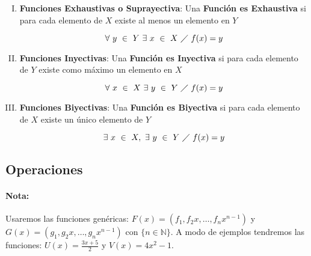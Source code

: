 \begin{enumerate}[I.]

\item \textbf{Funciones Exhaustivas o Suprayectiva}: Una \textbf{Función es 
Exhaustiva} si para cada elemento de $X$ existe al menos un elemento en $Y$

\begin{equation}
\forall\ y\ \in\ Y\ \exists\ x\ \in\ X\ \diagup\ f(x) = y
\end{equation}

\item \textbf{Funciones Inyectivas}: Una \textbf{Función es Inyectiva} si para 
cada elemento de $Y$ existe como máximo un elemento en $X$

\begin{equation}
\forall\ x\ \in\ X\ \exists\ y\ \in\ Y\ \diagup\ f(x) = y
\end{equation}

\item \textbf{Funciones Biyectivas}: Una \textbf{Función es Biyectiva} si para 
cada elemento de $X$ existe un único elemento de $Y$

\begin{equation}
\exists\ x\ \in\ X,\ \exists\ y\ \in\ Y\ \diagup\ f(x) = y
\end{equation}



\end{enumerate}


\subsection{Operaciones}

\paragraph*{Nota:} Usaremos las funciones genéricas: $F(x) = (f_1, f_2 x, 
\ldots, f_n x^{n-1})$ y $G(x) = (g_1, g_2 x , \ldots, g_n x^{n-1})$ con $\{n 
\in 
\mathbb{N}\}$. A modo de ejemplos tendremos las funciones: $U(x) = \frac{3x+5}{2}$ y 
$V(x) = 4x^{2} -1$.


